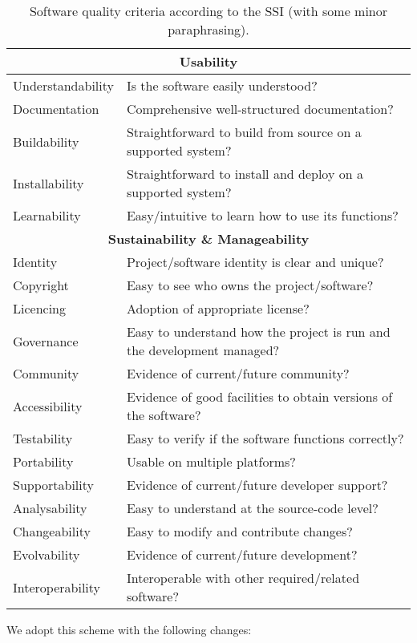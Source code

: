 \documentclass[a4paper,11pt]{article}
\begin{document}
\begin{table}[hbt]
\begin{tabular}{l|l}
\hline
\multicolumn{2}{c}{\textbf{Usability}} \\
\hline
Understandability & Is the software easily understood? \\ 
Documentation & Comprehensive well-structured documentation? \\
Buildability  & Straightforward to build from source on a supported system? \\
Installability  & Straightforward to install and deploy on a supported system? \\
Learnability & Easy/intuitive to learn how to use its functions? \\
\hline
\multicolumn{2}{c}{\textbf{Sustainability \& Manageability}} \\
\hline
Identity & Project/software identity is clear and unique? \\
Copyright & Easy to see who owns the project/software? \\
Licencing & Adoption of appropriate license? \\
Governance & Easy to understand how the project is run and the development managed? \\
Community & Evidence of current/future community? \\
Accessibility & Evidence of good facilities to obtain versions of the software? \\
Testability & Easy to verify if the software functions correctly? \\
Portability & Usable on multiple platforms? \\
Supportability & Evidence of current/future developer support? \\
Analysability & Easy to understand at the source-code level? \\
Changeability & Easy to modify and contribute changes? \\
Evolvability & Evidence of current/future development? \\
Interoperability & Interoperable with other required/related software? \\
\hline
\end{tabular}
\caption{Software quality criteria according to the SSI \citep{SSIGUIDE} (with some minor paraphrasing).}
\label{tab:criteria}
\end{table}

We adopt this scheme with the following changes:
\end{document}
